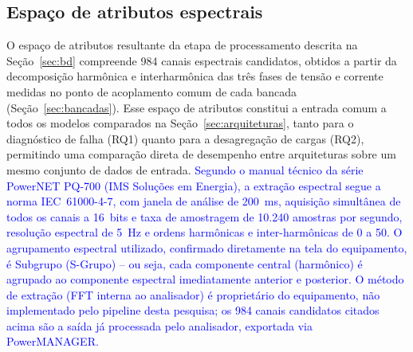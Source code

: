 \documentclass[times,final]{elsarticle}
\begin{document}
\subsection{Espaço de atributos espectrais}
\label{sec:atributos}
O espaço de atributos resultante da etapa de processamento descrita na Seção~\ref{sec:bd} compreende 984 canais espectrais candidatos, obtidos a partir da decomposição harmônica e interharmônica das três fases de tensão e corrente medidas no ponto de acoplamento comum de cada bancada (Seção~\ref{sec:bancadas}). Esse espaço de atributos constitui a entrada comum a todos os modelos comparados na Seção~\ref{sec:arquiteturas}, tanto para o diagnóstico de falha (RQ1) quanto para a desagregação de cargas (RQ2), permitindo uma comparação direta de desempenho entre arquiteturas sobre um mesmo conjunto de dados de entrada. \textcolor{blue}{Segundo o manual técnico da série PowerNET PQ-700 (IMS Soluções em Energia), a extração espectral segue a norma IEC~61000-4-7, com janela de análise de 200~ms, aquisição simultânea de todos os canais a 16~bits e taxa de amostragem de 10.240 amostras por segundo, resolução espectral de 5~Hz e ordens harmônicas e inter-harmônicas de 0 a 50. O agrupamento espectral utilizado, confirmado diretamente na tela do equipamento, é Subgrupo (S-Grupo) -- ou seja, cada componente central (harmônico) é agrupado ao componente espectral imediatamente anterior e posterior. O método de extração (FFT interna ao analisador) é proprietário do equipamento, não implementado pelo pipeline desta pesquisa; os 984 canais candidatos citados acima são a saída já processada pelo analisador, exportada via PowerMANAGER.}
\end{document}
